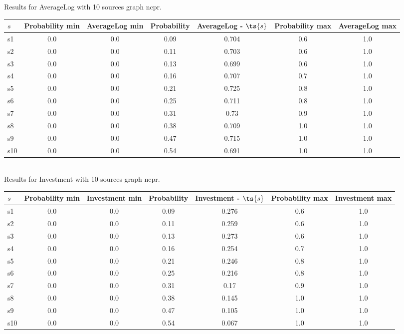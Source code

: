 \documentclass{article}
\begin{document}
\noindent Results for AverageLog with 10 sources graph ncpr.

\noindent\begin{tabular}{|l|c|c|c|c|c|c|}
\hline
$s$& Probability min & AverageLog min & Probability & AverageLog - $\ts{s}$ & Probability max & AverageLog max\\
\hline
s1 &0.0 & 0.0 & 0.09 & 0.704 & 0.6 & 1.0\\
\hline
s2 &0.0 & 0.0 & 0.11 & 0.703 & 0.6 & 1.0\\
\hline
s3 &0.0 & 0.0 & 0.13 & 0.699 & 0.6 & 1.0\\
\hline
s4 &0.0 & 0.0 & 0.16 & 0.707 & 0.7 & 1.0\\
\hline
s5 &0.0 & 0.0 & 0.21 & 0.725 & 0.8 & 1.0\\
\hline
s6 &0.0 & 0.0 & 0.25 & 0.711 & 0.8 & 1.0\\
\hline
s7 &0.0 & 0.0 & 0.31 & 0.73 & 0.9 & 1.0\\
\hline
s8 &0.0 & 0.0 & 0.38 & 0.709 & 1.0 & 1.0\\
\hline
s9 &0.0 & 0.0 & 0.47 & 0.715 & 1.0 & 1.0\\
\hline
s10 &0.0 & 0.0 & 0.54 & 0.691 & 1.0 & 1.0\\
\hline
\end{tabular}\\

\noindent Results for Investment with 10 sources graph ncpr.

\noindent\begin{tabular}{|l|c|c|c|c|c|c|}
\hline
$s$& Probability min & Investment min & Probability & Investment - $\ts{s}$ & Probability max & Investment max\\
\hline
s1 &0.0 & 0.0 & 0.09 & 0.276 & 0.6 & 1.0\\
\hline
s2 &0.0 & 0.0 & 0.11 & 0.259 & 0.6 & 1.0\\
\hline
s3 &0.0 & 0.0 & 0.13 & 0.273 & 0.6 & 1.0\\
\hline
s4 &0.0 & 0.0 & 0.16 & 0.254 & 0.7 & 1.0\\
\hline
s5 &0.0 & 0.0 & 0.21 & 0.246 & 0.8 & 1.0\\
\hline
s6 &0.0 & 0.0 & 0.25 & 0.216 & 0.8 & 1.0\\
\hline
s7 &0.0 & 0.0 & 0.31 & 0.17 & 0.9 & 1.0\\
\hline
s8 &0.0 & 0.0 & 0.38 & 0.145 & 1.0 & 1.0\\
\hline
s9 &0.0 & 0.0 & 0.47 & 0.105 & 1.0 & 1.0\\
\hline
s10 &0.0 & 0.0 & 0.54 & 0.067 & 1.0 & 1.0\\
\hline
\end{tabular}\\
\end{document}
